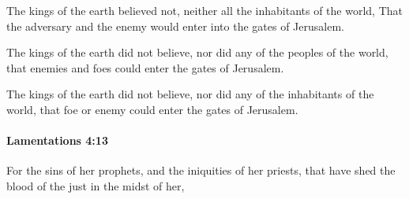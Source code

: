 			\begin{versebox}
					\item[BHS] 
					\item[LXX] 
					\item[ASV] The kings of the earth believed not, neither all the inhabitants of the world, That the adversary and the enemy would enter into the gates of Jerusalem.
					\item[NIV] The kings of the earth did not believe, nor did any of the peoples of the world, that enemies and foes could enter the gates of Jerusalem.
					\item[NRSV] The kings of the earth did not believe, nor did any of the inhabitants of the world, that foe or enemy could enter the gates of Jerusalem.
			\end{versebox}

		\paragraph{Lamentations 4:13} %
			\label{LAMENTATIONS-4-13}

			For the sins of her prophets, and the iniquities of her priests, that have shed the blood of the just in the midst of her,

